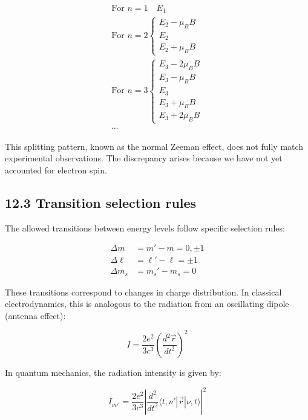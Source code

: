 \documentclass[italian]{HKNdocument}
\begin{document}
\begin{gather*}
\text{For } n=1 \quad E_1 \\
\text{For } n=2\left\{\begin{array}{l}
E_2-\mu_B B \\
E_2 \\
E_2+\mu_B B
\end{array}\right. \\
\text{For } n=3\left\{\begin{array}{l}
E_3-2\mu_B B \\
E_3-\mu_B B \\
E_3 \\
E_3+\mu_B B \\
E_3+2\mu_B B
\end{array}\right. \tag{12.26}\\
\cdots
\end{gather*}

This splitting pattern, known as the normal Zeeman effect, does not fully match experimental observations. The discrepancy arises because we have not yet accounted for electron spin.

\subsection*{12.3 Transition selection rules}
The allowed transitions between energy levels follow specific selection rules:

\begin{align*}
\Delta m &= m'-m=0,\pm 1 \\
\Delta\ell &= \ell'-\ell=\pm 1 \tag{12.27}\\
\Delta m_s &= m_s'-m_s=0
\end{align*}

These transitions correspond to changes in charge distribution. In classical electrodynamics, this is analogous to the radiation from an oscillating dipole (antenna effect):

\begin{equation*}
I=\frac{2e^2}{3c^3}\left(\frac{d^2\vec{r}}{dt^2}\right)^2 \tag{12.28}
\end{equation*}


In quantum mechanics, the radiation intensity is given by:

\begin{equation*}
I_{\nu\nu'}=\frac{2e^2}{3c^3}\left|\frac{d^2}{dt^2}\langle t,\nu'|\vec{r}|\nu,t\rangle\right|^2 \tag{12.29}
\end{equation*}
\end{document}

